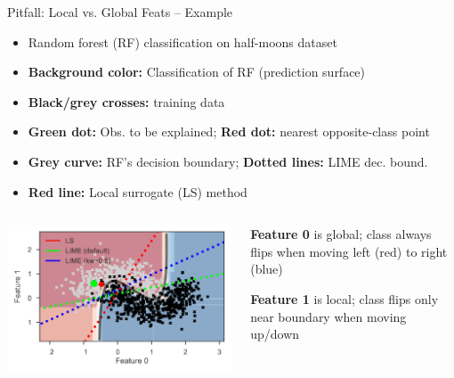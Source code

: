 \documentclass[10pt,compress,t,notes=noshow, xcolor=table]{beamer}
\begin{document}
\begin{frame}{Pitfall: Local vs. Global Feats -- Example}
\begin{itemize}
		\item Random forest (RF) classification on half-moons dataset
		    \item \textbf{Background color:} Classification of RF (prediction surface)
		    \item \textbf{Black/grey crosses:} training data
            \item \textbf{Green dot:} Obs. to be explained; \textbf{Red dot:} nearest  opposite-class point
		    \item \textbf{Grey curve:} RF's decision boundary; \textbf{Dotted lines:} LIME dec. bound.
             \item \textbf{Red line:} Local surrogate (LS) method 
	\end{itemize}

    
\begin{columns}[T, totalwidth=\textwidth]
  \begin{column}{0.63\textwidth}
	\includegraphics[width=\textwidth, trim = 5px 5px 0px 10px, clip]{figure/lime-globallocal2}
  \end{column}
  \pause
  \begin{column}{0.37\textwidth}
  \textbf{Feature 0} is global;
  class always flips when moving left (red) to right (blue)
  \medskip
  
  \textbf{Feature 1} is local;
  class flips only near boundary when moving up/down
\medskip


\end{column}
\end{columns}
\end{frame}
\end{document}
